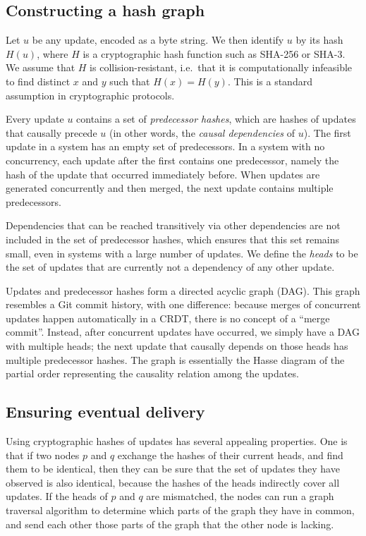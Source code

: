 \documentclass[sigplan,review]{acmart}
\begin{document}
\subsection{Constructing a hash graph}\label{sec:hash-graph}

Let $u$ be any update, encoded as a byte string.
We then identify $u$ by its hash $H(u)$, where $H$ is a cryptographic hash function such as SHA-256 or SHA-3.
We assume that $H$ is collision-resistant, i.e.\ that it is computationally infeasible to find distinct $x$ and $y$ such that $H(x) = H(y)$.
This is a standard assumption in cryptographic protocols.

Every update $u$ contains a set of \emph{predecessor hashes}, which are hashes of updates that causally precede $u$ (in other words, the \emph{causal dependencies} of $u$).
The first update in a system has an empty set of predecessors.
In a system with no concurrency, each update after the first contains one predecessor, namely the hash of the update that occurred immediately before.
When updates are generated concurrently and then merged, the next update contains multiple predecessors.

Dependencies that can be reached transitively via other dependencies are not included in the set of predecessor hashes, which ensures that this set remains small, even in systems with a large number of updates.
We define the \emph{heads} to be the set of updates that are currently not a dependency of any other update.

Updates and predecessor hashes form a directed acyclic graph (DAG).
This graph resembles a Git commit history, with one difference: because merges of concurrent updates happen automatically in a CRDT, there is no concept of a ``merge commit''.
Instead, after concurrent updates have occurred, we simply have a DAG with multiple heads; the next update that causally depends on those heads has multiple predecessor hashes.
The graph is essentially the Hasse diagram of the partial order representing the causality relation among the updates.

\subsection{Ensuring eventual delivery}\label{sec:ensuring-delivery}

Using cryptographic hashes of updates has several appealing properties.
One is that if two nodes $p$ and $q$ exchange the hashes of their current heads, and find them to be identical, then they can be sure that the set of updates they have observed is also identical, because the hashes of the heads indirectly cover all updates.
If the heads of $p$ and $q$ are mismatched, the nodes can run a graph traversal algorithm to determine which parts of the graph they have in common, and send each other those parts of the graph that the other node is lacking.
\end{document}
